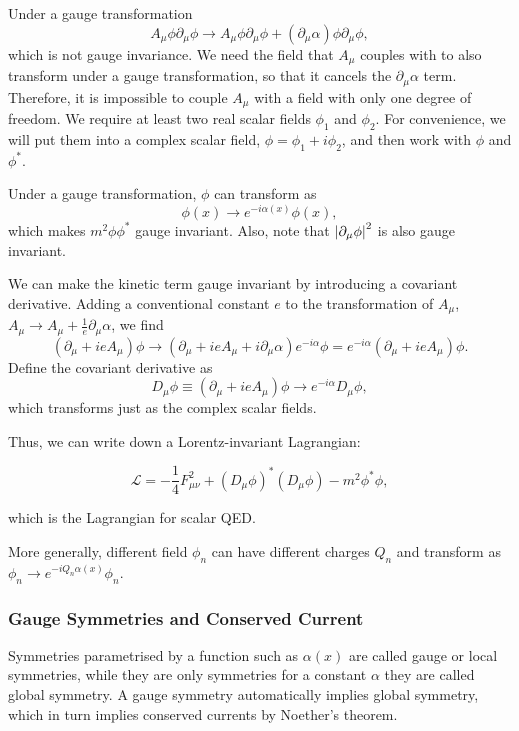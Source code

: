 \documentclass[11pt]{article}
\theoremstyle{definition}
\begin{document}
Under a gauge transformation
\begin{equation}
    A_\mu \phi\partial_\mu\phi \rightarrow A_\mu \phi\partial_\mu\phi + (\partial_\mu\alpha) \phi\partial_\mu\phi,
\end{equation}
which is not gauge invariance. We need the field that $A_\mu$ couples with to also transform under a gauge transformation, so that it cancels the $\partial_\mu\alpha$ term. Therefore, it is impossible to couple $A_\mu$ with a field with only one degree of freedom. We require at least two real scalar fields $\phi_1$ and $\phi_2$. For convenience, we will put them into a complex scalar field, $\phi = \phi_1 + i\phi_2$, and then work with $\phi$ and $\phi^*$.

Under a gauge transformation, $\phi$ can transform as 
\begin{equation}
    \phi(x) \rightarrow e^{-i\alpha(x)}\phi(x),
\end{equation}
which makes $m^2\phi\phi^*$ gauge invariant. Also, note that $\abs{\partial_\mu\phi}^2$ is also gauge invariant.

We can make the kinetic term gauge invariant by introducing a covariant derivative. Adding a conventional constant $e$ to the transformation of $A_\mu$, $A_\mu \rightarrow A_\mu + \frac{1}{e}\partial_\mu\alpha$, we find
\begin{equation}
    (\partial_\mu+ieA_\mu)\phi \rightarrow (\partial_\mu+ieA_\mu + i \partial_\mu\alpha)e^{-i\alpha}\phi = e^{-i\alpha}(\partial_\mu+ieA_\mu)\phi.
\end{equation}
Define the covariant derivative as
\begin{equation}
    D_\mu \phi \equiv (\partial_\mu+ieA_\mu)\phi \rightarrow e^{-i\alpha}D_\mu \phi,
\end{equation}
which transforms just as the complex scalar fields.

Thus, we can write down a Lorentz-invariant Lagrangian:
\begin{shaded}
    \begin{equation}
    \mathcal{L} = -\frac{1}{4}F^2_{\mu\nu} + (D_\mu\phi)^*(D_\mu\phi) - m^2 \phi^*\phi,
    \label{Eq. Scalar QED L}
\end{equation}
\end{shaded}
which is the Lagrangian for scalar QED.

More generally, different field $\phi_n$ can have different charges $Q_n$ and transform as $\phi_n \rightarrow e^{-iQ_n\alpha(x)} \phi_n$.

\subsubsection{Gauge Symmetries and Conserved Current}
Symmetries parametrised by a function such as $\alpha(x)$ are called gauge or local symmetries, while they are only symmetries for a constant $\alpha$ they are called global symmetry. A gauge symmetry automatically implies global symmetry, which in turn implies conserved currents by Noether's theorem.
\end{document}
